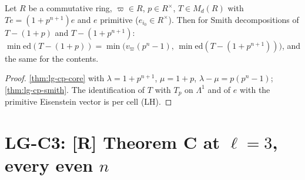 \begin{theorem}\label{thm:lg-cp}
  \leanok
  Let $R$ be a commutative ring, $\varpi\in R$, $p\in R^\times$, $T\in M_d(R)$ with $Te=(1+p^{n+1})e$ and $e$ primitive ($e_{i_0}\in R^\times$).
  Then for Smith decompositions of $T-(1+p)$ and $T-(1+p^{n+1})$:
  $\min\mathrm{ed}(T-(1+p))=\min\bigl(v_\varpi(p^n-1),\,\min\mathrm{ed}(T-(1+p^{n+1}))\bigr)$, and the same for the contents.
\end{theorem}
\begin{proof}
  \leanok
  \ref{thm:lg-cp-core} with $\lambda=1+p^{n+1}$, $\mu=1+p$, $\lambda-\mu=p(p^n-1)$; \ref{thm:lg-cp-smith}.  The identification of $T$
  with $T_p$ on $\Lambda^1$ and of $e$ with the primitive Eisenstein vector is per cell (LH).
\end{proof}

\section{LG-C3: {[R]} Theorem C at \texorpdfstring{$\ell=3$}{l = 3}, every even \texorpdfstring{$n$}{n}}

